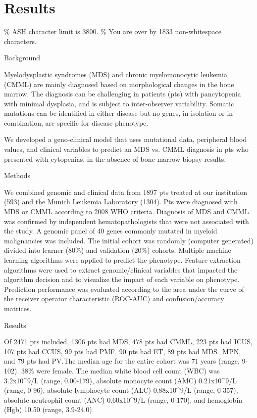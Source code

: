 \section{Results}%
\% ASH character limit is 3800. 
\% You are over by 1833 non-whitespace characters.


Background

Myelodysplastic syndromes (MDS) and chronic myelomonocytic leukemia (CMML) are mainly diagnosed based on morphological changes in the bone marrow. The diagnosis can be challenging in patients (pts) with pancytopenia with minimal dysplasia, and is subject to inter-observer variability. Somatic mutations can be identified in either disease but no genes, in isolation or in combination, are specific for disease phenotype.

We developed a geno-clinical model that uses mutational data, peripheral blood values, and clinical variables to predict an MDS vs. CMML diagnosis in pts who presented with cytopenias, in the absence of bone marrow biopsy results.


Methods

We combined genomic and clinical data from 1897 pts treated at our institution (593) and the Munich Leukemia Laboratory (1304). Pts were diagnosed with MDS or CMML according to 2008 WHO criteria. Diagnosis of MDS and CMML was confirmed by independent hematopathologists that were not associated with the study. A genomic panel of 40 genes commonly mutated in myeloid malignancies was included. The initial cohort was randomly (computer generated) divided into learner (80\%) and validation (20\%) cohorts. Multiple machine learning algorithms were applied to predict the phenotype. Feature extraction algorithms were used to extract genomic/clinical variables that impacted the algorithm decision and to visualize the impact of each variable on phenotype. Prediction performance was evaluated according to the area under the curve of the receiver operator characteristic (ROC-AUC) and confusion/accuracy matrices.


Results

Of 2471 pts included, 1306 pts had MDS, 478 pts had CMML, 223 pts had ICUS, 107 pts had CCUS, 99 pts had PMF, 90 pts had ET, 89 pts had MDS_MPN, and 79 pts had PV.The median age for the entire cohort was 71 years (range, 9-102). 38\% were female. The median white blood cell count (WBC) was 3.2x10^9/L (range, 0.00-179), absolute monocyte count (AMC) 0.21x10^9/L (range, 0-96), absolute lymphocyte count (ALC) 0.88x10^9/L (range, 0-357), absolute neutrophil count (ANC) 0.60x10^9/L (range, 0-170), and hemoglobin (Hgb)  10.50 (range, 3.9-24.0). 

